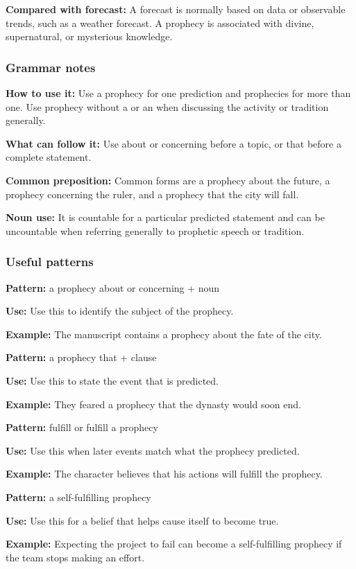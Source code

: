 \documentclass[11pt]{article}
\begin{document}
\textbf{Compared with forecast:} A forecast is normally based on data or observable trends, such as a weather forecast. A prophecy is associated with divine, supernatural, or mysterious knowledge.

\subsubsection{Grammar notes}
\textbf{How to use it:} Use a prophecy for one prediction and prophecies for more than one. Use prophecy without a or an when discussing the activity or tradition generally.

\textbf{What can follow it:} Use about or concerning before a topic, or that before a complete statement.

\textbf{Common preposition:} Common forms are a prophecy about the future, a prophecy concerning the ruler, and a prophecy that the city will fall.

\textbf{Noun use:} It is countable for a particular predicted statement and can be uncountable when referring generally to prophetic speech or tradition.

\subsubsection{Useful patterns}
\textbf{Pattern:} a prophecy about or concerning + noun

\textbf{Use:} Use this to identify the subject of the prophecy.

\textbf{Example:} The manuscript contains a prophecy about the fate of the city.

\textbf{Pattern:} a prophecy that + clause

\textbf{Use:} Use this to state the event that is predicted.

\textbf{Example:} They feared a prophecy that the dynasty would soon end.

\textbf{Pattern:} fulfill or fulfill a prophecy

\textbf{Use:} Use this when later events match what the prophecy predicted.

\textbf{Example:} The character believes that his actions will fulfill the prophecy.

\textbf{Pattern:} a self-fulfilling prophecy

\textbf{Use:} Use this for a belief that helps cause itself to become true.

\textbf{Example:} Expecting the project to fail can become a self-fulfilling prophecy if the team stops making an effort.
\end{document}
